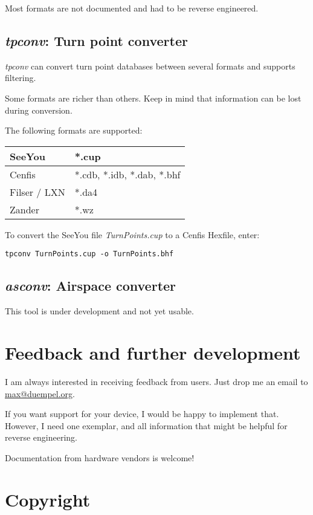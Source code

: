 \documentclass{article}
\begin{document}
Most formats are not documented and had to be reverse engineered.


\subsection{{\em tpconv}: Turn point converter}

{\em tpconv} can convert turn point databases between several formats
and supports filtering.

Some formats are richer than others.  Keep in mind that information
can be lost during conversion.

The following formats are supported:

\begin{tabular}{|l|l|}
\hline
SeeYou & *.cup \\
\hline
Cenfis & *.cdb, *.idb, *.dab, *.bhf \\
\hline
Filser / LXN & *.da4 \\
\hline
Zander & *.wz \\
\hline
\end{tabular}

To convert the SeeYou file {\em TurnPoints.cup} to a Cenfis Hexfile,
enter:

\begin{verbatim}
tpconv TurnPoints.cup -o TurnPoints.bhf 
\end{verbatim}


\subsection{{\em asconv}: Airspace converter}

This tool is under development and not yet usable.


\section{Feedback and further development}

I am always interested in receiving feedback from users.  Just drop me
an email to \href{mailto:max@duempel.org}{max@duempel.org}.

If you want support for your device, I would be happy to implement
that.  However, I need one exemplar, and all information that might be
helpful for reverse engineering.

Documentation from hardware vendors is welcome!


\section{Copyright}
\end{document}
